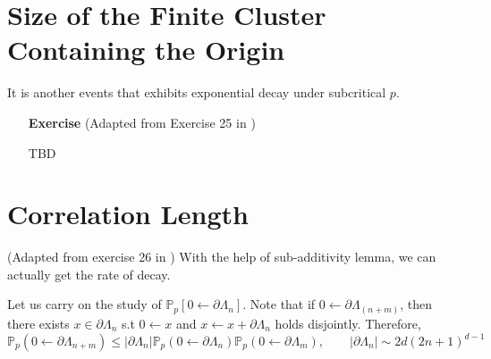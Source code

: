\documentclass[12pt,a4paper]{report}
\theoremstyle{definition}
\newcommand{\SOL}{\fbox{ \tt s\parbox[b][2pt][c]{6pt}{o}\hspace*{-7pt} L:}}
\begin{document}
\section{Size of the Finite Cluster Containing the Origin}
It is another events that exhibits exponential decay under subcritical $p$. 
\begin{enumerate}
	\item[\textbf{Exercise}](Adapted from Exercise 25 in \cite{Copin18})
	\item[\SOL] TBD 
\end{enumerate}
\section{Correlation Length}
(Adapted from exercise 26 in \cite{Copin18})
With the help of sub-additivity lemma, we can actually get the rate of decay.

Let us carry on the study of $\mathbb{P}_p[0 \longleftarrow \partial \Lambda_n]$.
Note that if $0 \longleftarrow \partial \Lambda_(n+m)$, then there exists $x \in \partial \Lambda_n$ s.t $0 \longleftarrow x$ and $x \longleftarrow x + \partial \Lambda_n$ holds disjointly.
Therefore,
\begin{equation}\label{3-3eq_tobox}
	\mathbb{P}_p(0 \longleftarrow \partial \Lambda_{n+m}) \leq |\partial \Lambda_n| \mathbb{P}_p(0 \longleftarrow \partial \Lambda_n)\mathbb{P}_p(0 \longleftarrow \partial \Lambda_m),  \qquad |\partial \Lambda_n| \sim 2d(2n+1)^{d-1}
\end{equation}
\end{document}
